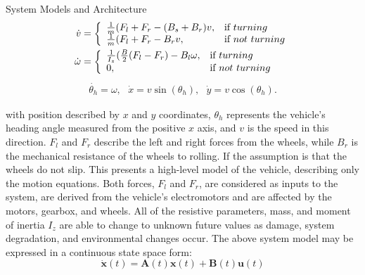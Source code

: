 \begin{section}{System Models and Architecture}
	\begin{equation}
    \begin{split}
    \label{eqn:plant}
    \dot{v}&=\left\{
    \begin{array}{ll}
    \frac{1}{m}(F_l+F_r-(B_s+B_r)v, & \hbox{if } turning\\
    \frac{1}{m}(F_l+F_r-B_rv, & \hbox{if } not~turning
    \end{array}
    \right.\\
    \dot{\omega}&=\left\{
    \begin{array}{ll}
    \frac{1}{I_z}(\frac{B}{2}(F_l-F_r)-B_l\omega, & \hbox{if } turning\\
    0, & \hbox{if } not~turning
    \end{array}
    \right.\\
    \end{split}
    \end{equation}
    \begin{align}
     \dot{\theta_h}=\omega,\text{ } \dot{x}=v\sin(\theta_h),\text{ } \dot{y}=v\cos(\theta_h).
	\end{align}
	
with position described by $x$ and $y$ coordinates, $\theta_h$ represents the vehicle's heading angle measured from the positive $x$ axis, and $v$ is the speed in this direction. $F_l$ and $F_r$ describe the left and right forces from the wheels, while $B_r$ is the mechanical resistance of the wheels to rolling. If the assumption is that the wheels do not slip.
This presents a high-level model of the vehicle, describing only the motion equations. Both forces, $F_l$ and $F_r$, are considered as inputs to the system, are derived from the vehicle's electromotors and are affected by the motors, gearbox, and wheels. All of the resistive parameters, mass, and moment of inertia $I_z$ are able to change to unknown future values as damage, system degradation, and environmental changes occur. The above system model may be expressed in a continuous state space form:
    \begin{equation}
	\dot{\bm{x}}(t) = \bm{A}(t)\bm{x}(t) + \bm{B}(t)\bm{u}(t)
	\end{equation}
	

\end{section}
